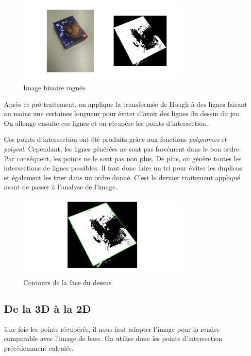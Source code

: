 \documentclass{st50_template}
\begin{document}
\begin{figure}[ht]
    \centering
    \includegraphics[width=0.77\textwidth]{images/rognage.jpg}
    \caption{Image binaire rognée}
    \label{rognage}
\end{figure}

Après ce pré-traitement, on applique la transformée de Hough à des lignes faisant au moins une certaines longueur pour éviter d'avoir des lignes du dessin du jeu. On allonge ensuite ces lignes et on récupère les points d'intersection. 

Ces points d'intersection ont été produits grâce aux fonctions \emph{polynomes} et \emph{polyval}. Cependant, les lignes générées ne sont pas forcément dans le bon ordre. Par conséquent, les points ne le sont pas non plus. De plus, on génère toutes les intersections de lignes possibles. Il faut donc faire un tri pour éviter les duplicas et également les trier dans un ordre donné. C'est le dernier traitement appliqué avant de passer à l'analyse de l'image.

\begin{figure}[ht]
    \centering
    \includegraphics[width=0.77\textwidth]{images/contourEtPts.jpg}
    \caption{Contours de la face du dessus}
    \label{contourEtPts}
\end{figure}

\subsection{De la 3D à la 2D}
Une fois les points récupérés, il nous faut adapter l'image pour la rendre comparable avec l'image de base. On utilise donc les points d'intersection précédemment calculés.
\end{document}

